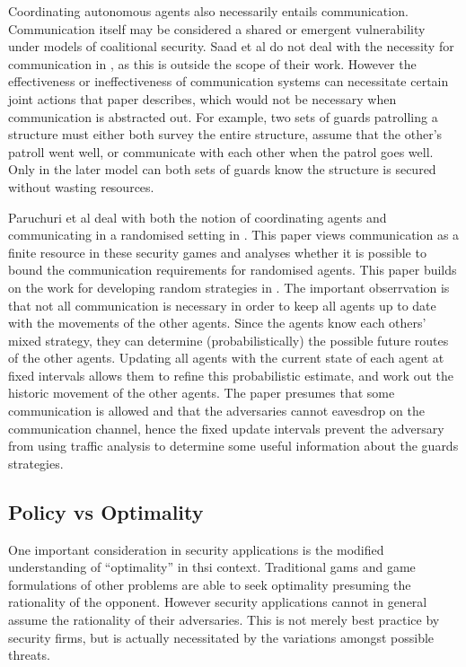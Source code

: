 \documentclass{article}
\begin{document}
Coordinating autonomous agents also necessarily entails communication.
Communication itself may be considered a shared or emergent vulnerability under models of coalitional security.
Saad et al do not deal with the necessity for communication in \cite{coalition}, as this is outside the scope of their work.
However the effectiveness or ineffectiveness of communication systems can necessitate certain joint actions that paper describes, which would not be necessary when communication is abstracted out.
For example, two sets of guards patrolling a structure must either both survey the entire structure, assume that the other's patroll went well, or communicate with each other when the patrol goes well.
Only in the later model can both sets of guards know the structure is secured without wasting resources.

Paruchuri et al deal with both the notion of coordinating agents and communicating in a randomised setting in \cite{random}.
This paper views communication as a finite resource in these security games and analyses whether it is possible to bound the communication requirements for randomised agents.
This paper builds on the work for developing random strategies in \cite{xrandom}.
The important obserrvation is that not all communication is necessary in order to keep all agents up to date with the movements of the other agents.
Since the agents know each others' mixed strategy, they can determine (probabilistically) the possible future routes of the other agents.
Updating all agents with the current state of each agent at fixed intervals allows them to refine this probabilistic estimate, and work out the historic movement of the other agents.
The paper presumes that some communication is allowed and that the adversaries cannot eavesdrop on the communication channel, hence the fixed update intervals prevent the adversary from using traffic analysis to determine some useful information about the guards strategies.


\subsection{Policy vs Optimality}

One important consideration in security applications is the modified understanding of ``optimality'' in thsi context.
Traditional gams and game formulations of other problems are able to seek optimality presuming the rationality of the opponent.
However security applications cannot in general assume the rationality of their adversaries.
This is not merely best practice by security firms, but is actually necessitated by the variations amongst possible threats.
\end{document}
